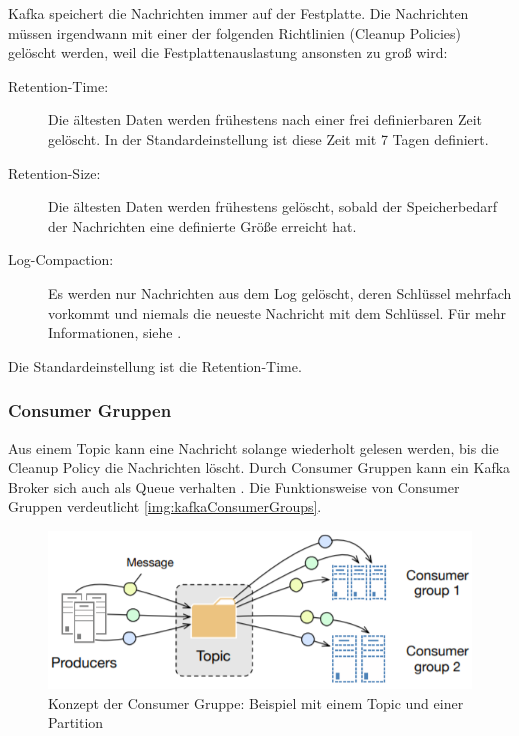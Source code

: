 \documentclass[a4paper,titlepage,halfparskip,12pt]{scrreprt}
\begin{document}
\begin{onehalfspacing}
Kafka speichert die Nachrichten immer auf der Festplatte. Die Nachrichten müssen irgendwann mit einer der folgenden Richtlinien (Cleanup Policies) \cite{berleKafkaOverview} gelöscht werden, weil die Festplattenauslastung ansonsten zu groß wird:

\begin{description}
\item[Retention-Time:] Die ältesten Daten werden frühestens nach einer frei definierbaren Zeit gelöscht. In der Standardeinstellung ist diese Zeit mit 7 Tagen definiert.
\item[Retention-Size:] Die ältesten Daten werden frühestens gelöscht, sobald der Speicherbedarf der Nachrichten eine definierte Größe erreicht hat.
\item[Log-Compaction:] Es werden nur Nachrichten aus dem Log gelöscht, deren Schlüssel mehrfach vorkommt und niemals die neueste Nachricht mit dem Schlüssel. Für mehr Informationen, siehe \cite{kafkaLogCompaction}.
\end{description}

Die Standardeinstellung ist die Retention-Time.

\pagebreak

\subsubsection*{Consumer Gruppen}

Aus einem Topic kann eine Nachricht solange wiederholt gelesen werden, bis die Cleanup Policy die Nachrichten löscht. Durch Consumer Gruppen kann ein Kafka Broker sich auch als Queue verhalten \cite{nannoniDissKafka}. Die Funktionsweise von Consumer Gruppen verdeutlicht \autoref{img:kafkaConsumerGroups}.

\begin{figure}[h]
	\centering
	\includegraphics[width=.8\textwidth]{images/kafkaConsumerGroups}
	\caption{Konzept der Consumer Gruppe: Beispiel mit einem Topic und einer Partition \cite{nannoniDissKafka}}
	\label{img:kafkaConsumerGroups}
\end{figure}


\end{onehalfspacing}
\end{document}
